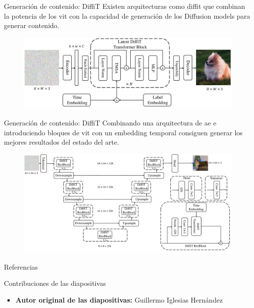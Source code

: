 \begin{frame}{Generación de contenido: DiffiT}
Existen arquitecturas como \alert{\gls{diffit}} \cite{hatamizadeh2024diffit} que combinan la potencia de los \gls{vit} con la capacidad de generación de los \alert{Diffusion models} para generar contenido.

\begin{figure}
    \centering
    \includegraphics[width=\textwidth]{Slides/figures/Vision_Transformers/DiffiT_Architecture.png}
    \caption{\cite{hatamizadeh2024diffit}}
\end{figure}
\end{frame}

\begin{frame}{Generación de contenido: DiffiT}
Combinando una arquitectura de \alert{\gls{ae}} e introduciendo bloques de \gls{vit} con un \alert{embedding temporal} consiguen generar los mejores resultados del estado del arte.

\begin{figure}
    \centering
    \includegraphics[width=\textwidth]{Slides/figures/Vision_Transformers/DiffiT_Transformer.png}
    \caption{\cite{hatamizadeh2024diffit}}
\end{figure}
\end{frame}


\begin{frame}[allowframebreaks]{Referencias}
    
    
\end{frame}

\begin{frame}{Contribuciones de las diapositivas}
\begin{itemize}
    \item \textbf{Autor original de las diapositivas:} Guillermo Iglesias Hernández
\end{itemize}
\end{frame}

